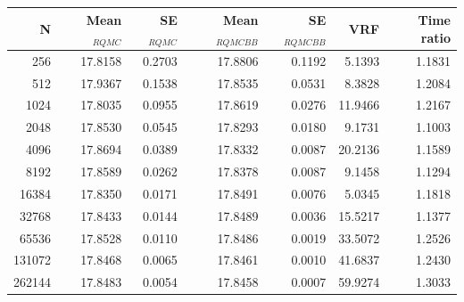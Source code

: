 \begin{tabular}{rrrrrrr}
\toprule
N & Mean$_{RQMC}$ & SE$_{RQMC}$ & Mean$_{RQMCBB}$ & SE$_{RQMCBB}$ & VRF & Time ratio \\
\midrule
256 & 17.8158 & 0.2703 & 17.8806 & 0.1192 & 5.1393 & 1.1831 \\
512 & 17.9367 & 0.1538 & 17.8535 & 0.0531 & 8.3828 & 1.2084 \\
1024 & 17.8035 & 0.0955 & 17.8619 & 0.0276 & 11.9466 & 1.2167 \\
2048 & 17.8530 & 0.0545 & 17.8293 & 0.0180 & 9.1731 & 1.1003 \\
4096 & 17.8694 & 0.0389 & 17.8332 & 0.0087 & 20.2136 & 1.1589 \\
8192 & 17.8589 & 0.0262 & 17.8378 & 0.0087 & 9.1458 & 1.1294 \\
16384 & 17.8350 & 0.0171 & 17.8491 & 0.0076 & 5.0345 & 1.1818 \\
32768 & 17.8433 & 0.0144 & 17.8489 & 0.0036 & 15.5217 & 1.1377 \\
65536 & 17.8528 & 0.0110 & 17.8486 & 0.0019 & 33.5072 & 1.2526 \\
131072 & 17.8468 & 0.0065 & 17.8461 & 0.0010 & 41.6837 & 1.2430 \\
262144 & 17.8483 & 0.0054 & 17.8458 & 0.0007 & 59.9274 & 1.3033 \\
\bottomrule
\end{tabular}
